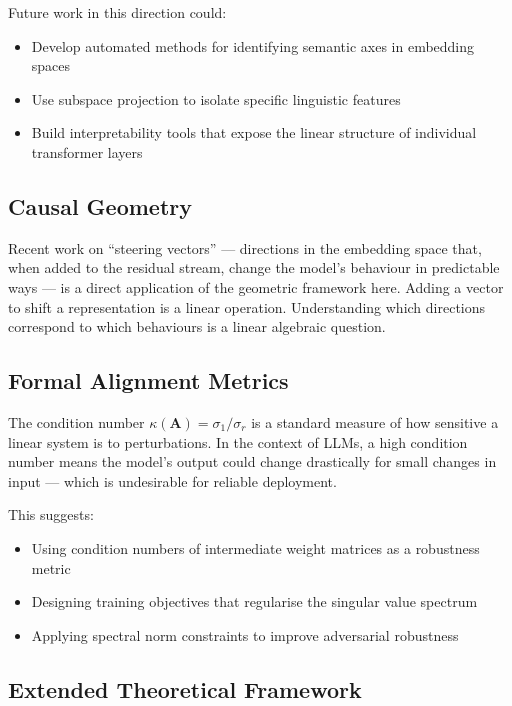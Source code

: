 \documentclass[12pt,a4paper]{article}
\begin{document}
Future work in this direction could:

\begin{itemize}[itemsep=4pt]
    \item Develop automated methods for identifying semantic axes in embedding spaces
    \item Use subspace projection to isolate specific linguistic features
    \item Build interpretability tools that expose the linear structure of individual
          transformer layers
\end{itemize}

\subsection{Causal Geometry}

Recent work on ``steering vectors'' --- directions in the embedding space that, when added
to the residual stream, change the model's behaviour in predictable ways --- is a direct
application of the geometric framework here. Adding a vector to shift a representation is
a linear operation. Understanding which directions correspond to which behaviours is a
linear algebraic question.

\subsection{Formal Alignment Metrics}

The condition number $\kappa(\mathbf{A}) = \sigma_1 / \sigma_r$ is a standard measure of
how sensitive a linear system is to perturbations. In the context of LLMs, a high condition
number means the model's output could change drastically for small changes in input ---
which is undesirable for reliable deployment.

This suggests:

\begin{itemize}[itemsep=4pt]
    \item Using condition numbers of intermediate weight matrices as a robustness metric
    \item Designing training objectives that regularise the singular value spectrum
    \item Applying spectral norm constraints to improve adversarial robustness
\end{itemize}

\subsection{Extended Theoretical Framework}
\end{document}
